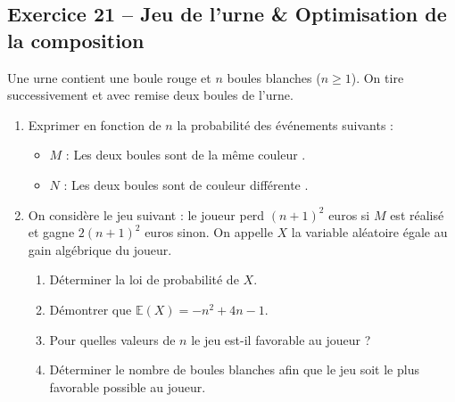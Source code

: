 \documentclass[11pt,a4paper]{article}
\newcommand{\E}{\mathbb{E}}
\begin{document}
\vspace{0.3cm}

\subsection*{Exercice 21 -- Jeu de l'urne \& Optimisation de la composition}

Une urne contient une boule rouge et $n$ boules blanches ($n \ge 1$). On tire successivement et avec remise deux boules de l'urne.
\begin{enumerate}[label=\arabic*.]
    \item Exprimer en fonction de $n$ la probabilité des événements suivants :
    \begin{itemize}[label=$\bullet$]
        \item $M$ : \og Les deux boules sont de la même couleur \fg{}.
        \item $N$ : \og Les deux boules sont de couleur différente \fg{}.
    \end{itemize}
    \item On considère le jeu suivant : le joueur perd $(n+1)^2$ euros si $M$ est réalisé et gagne $2(n+1)^2$ euros sinon. On appelle $X$ la variable aléatoire égale au gain algébrique du joueur.
    \begin{enumerate}
        \item Déterminer la loi de probabilité de $X$.
        \item Démontrer que $\E(X) = -n^2 + 4n - 1$.
        \item Pour quelles valeurs de $n$ le jeu est-il favorable au joueur ?
        \item Déterminer le nombre de boules blanches afin que le jeu soit le plus favorable possible au joueur.
    \end{enumerate}
\end{enumerate}
\end{document}
